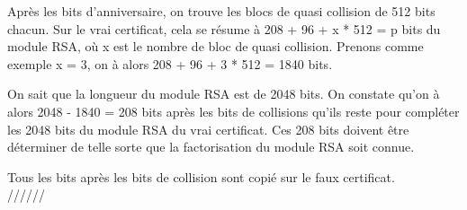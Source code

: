 \documentclass[a4paper,11pt,french]{article}
\begin{document}
Après les bits d'anniversaire, on trouve les blocs de quasi collision de 512 bits chacun. Sur le vrai certificat, cela se résume à 208 + 96 + x * 512 = p bits du module RSA, où x est le nombre de bloc de quasi collision. Prenons comme exemple x = 3, on à alors 208 + 96 + 3 * 512 = 1840 bits.

On sait que la longueur du module RSA est de 2048 bits. On constate qu'on à alors 2048 - 1840 = 208 bits après les bits de collisions qu'ils reste pour compléter les 2048 bits du module RSA du vrai certificat. Ces 208 bits doivent être déterminer de telle sorte que la factorisation du module RSA soit connue.

Tous les bits après les bits de collision sont copié sur le faux certificat.\\

//////


\end{document}
